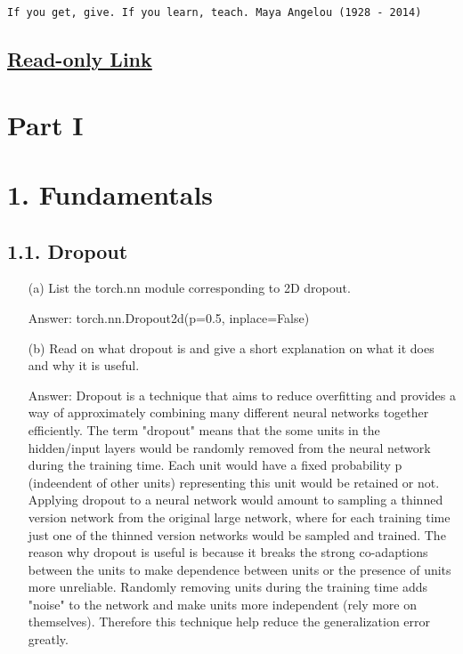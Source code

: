 \documentclass[12pt,letterpaper]{article}
\begin{document}
\begin{center}
\texttt{If you get, give.  If you learn, teach.  Maya Angelou (1928 - 2014)}
\end{center}
\subsection*{\centering  \href{}{Read-only Link}
}
\section*{\centering Part I}

\section*{1. Fundamentals}
\subsection*{1.1. Dropout}
\begin{itemize}
    \item[(a)] List the torch.nn module corresponding to 2D dropout. 
    
    Answer: torch.nn.Dropout2d(p=0.5, inplace=False)
    
    \item[(b)] Read on what dropout is and give a short explanation on what it does and why it is useful. 
    
    Answer: Dropout is a technique that aims to reduce overfitting and provides a way of approximately combining many different neural networks together efficiently. The term "dropout" means that the some units in the hidden/input layers would be randomly removed from the neural network during the training time. Each unit would have a fixed probability p (indeendent of other units) representing this unit would be retained or not. Applying dropout to a neural network would amount to sampling a thinned version network from the original large network, where for each training time just one of the thinned version networks would be sampled and trained. The reason why dropout is useful is because it breaks the strong co-adaptions between the units to make dependence between units or the presence of units more unreliable. Randomly removing units during the training time adds "noise" to the network and make units more independent (rely more on themselves). Therefore this technique help reduce the generalization error greatly.
\end{itemize}
\end{document}
